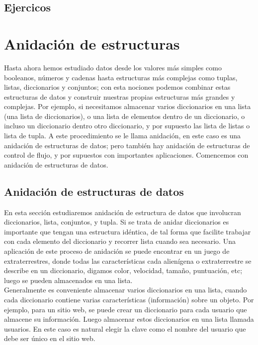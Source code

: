 \subsection{Ejercicos}



\section{Anidación de estructuras}

Hasta ahora hemos estudiado datos desde los valores más simples como booleanos, números y cadenas hasta estructuras más complejas como tuplas, listas, diccionarios y conjuntos; con esta nociones podemos combinar estas estructuras de datos y construir nuestras propias estructuras  más grandes y complejas. Por ejemplo, si   necesitamos  almacenar varios diccionarios en una lista (una lista de  diccionarios), o una lista de elementos dentro de un diccionario, o incluso un diccionario dentro otro diccionario, y por supuesto las lista de listas o lista de tupla. A este procedimiento se le llama anidación, en este caso es una anidación de estructuras de datos; pero también hay    
anidación de estructuras de control de flujo, y por supuestos con importantes aplicaciones.  Comencemos con anidación de estructuras
de datos.


\subsection{Anidación de estructuras de datos}

En esta sección estudiaremos anidación de estructura de datos que involucran diccionarios, lista, conjuntos,  y tupla. 
Si se trata de anidar diccionarios es importante que tengan una estructura idéntica, de tal forma que facilite trabajar con cada elemento del diccionario y recorrer lista cuando sea necesario. Una aplicación de este proceso de anidación se puede encontrar en un juego de extraterrestres, donde todas las características cada alienígena o extraterrestre se describe en un diccionario, digamos color,  velocidad, tamaño, puntuación,  etc;  luego se pueden almacenados en una lista.\\  


Generalmente es conveniente almacenar varios diccionarios en una lista, cuando cada diccionario contiene varias características (información) sobre un objeto. Por ejemplo, para un sitio web, se puede crear un diccionario para cada usuario que  almacene  su información. Luego almacenar estos diccionarios en una lista llamada usuarios. En este caso es natural elegir la clave como el nombre del usuario que debe ser único en el sitio web.\\



